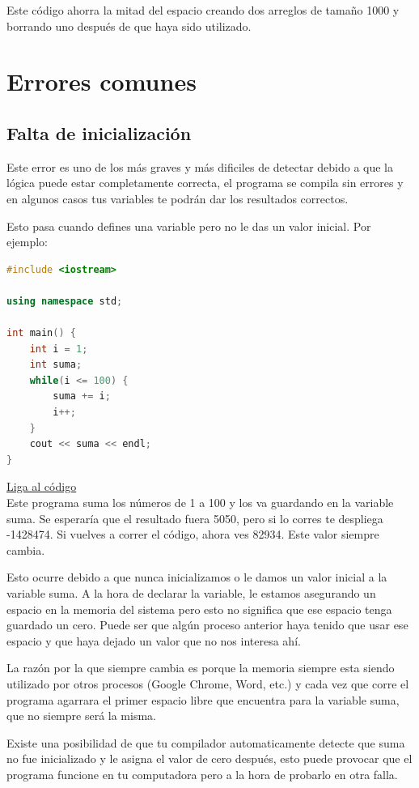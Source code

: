 \documentclass{article}
\begin{document}
Este código ahorra la mitad del espacio creando dos arreglos de tamaño 1000 y borrando uno después de que haya sido utilizado.

\section{Errores comunes}

\subsection{Falta de inicialización}
Este error es uno de los más graves y más dificiles de detectar debido a que la lógica puede estar completamente correcta, el programa se compila sin errores y en algunos casos tus variables te podrán dar los resultados correctos.

Esto pasa cuando defines una variable pero no le das un valor inicial. Por ejemplo:

\begin{lstlisting}[language=C++, title=Error de inicialización]
#include <iostream>

using namespace std;

int main() {
	int i = 1;
	int suma;
	while(i <= 100) {
		suma += i;
		i++;
	}
	cout << suma << endl;
}
\end{lstlisting}
\href{https://repl.it/@Jamesscn/Suma-Imposible}{Liga al código}\\

Este programa suma los números de 1 a 100 y los va guardando en la variable suma. Se esperaría que el resultado fuera 5050, pero si lo corres te despliega -1428474. Si vuelves a correr el código, ahora ves 82934. Este valor siempre cambia.

Esto ocurre debido a que nunca inicializamos o le damos un valor inicial a la variable suma. A la hora de declarar la variable, le estamos asegurando un espacio en la memoria del sistema pero esto no significa que ese espacio tenga guardado un cero. Puede ser que algún proceso anterior haya tenido que usar ese espacio y que haya dejado un valor que no nos interesa ahí.

La razón por la que siempre cambia es porque la memoria siempre esta siendo utilizado por otros procesos (Google Chrome, Word, etc.) y cada vez que corre el programa agarrara el primer espacio libre que encuentra para la variable suma, que no siempre será la misma.

Existe una posibilidad de que tu compilador automaticamente detecte que suma no fue inicializado y le asigna el valor de cero después, esto puede provocar que el programa funcione en tu computadora pero a la hora de probarlo en otra falla.
\end{document}

